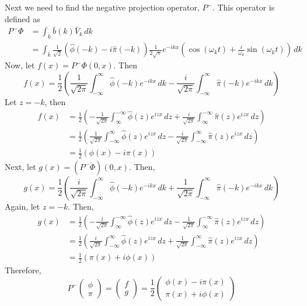\documentclass[12pt,oneside]{article}
\begin{document}
Next we need to find the negative projection operator, $P^-$. This operator is
defined as 
\begin{align}
P^-\Phi&=\int_k\bar{b}(k)\bar{V}_k\, dk\\
&=\int_{k}\frac{1}{\sqrt{2}}\left(\hat{\phi}(-k)-i\hat{\pi}(-k)\right)\frac{1}{2\sqrt{\pi}}e^{-ikx}\left(\cos(\omega_{k}t)
+\frac{i}{\omega_{k}}\sin(\omega_{k}t)\right)\, dk
\end{align}
Now, let $f(x)=P^{-}\Phi(0,x)$. Then
\begin{equation}
f(x)=\frac{1}{2}\left(\frac{1}{\sqrt{2\pi}}\int_{-\infty}^{\infty}\hat{\phi}(-k)e^{-ikx}\, dk-\frac{i}{\sqrt{2\pi}}\int_{-\infty}^{\infty}\hat{\pi}(-k)e^{-ikx}\, dk\right)
\end{equation}
Let $z=-k$, then
\begin{align*}
f(x)&=\frac{1}{2}\left(-\frac{1}{\sqrt{2\pi}}\int_{\infty}^{-\infty}\hat{\phi}(z)e^{izx}\, dz+\frac{i}{\sqrt{2\pi}}\int_{\infty}^{-\infty}\hat{\pi}(z)e^{izx}\, dz\right)\\
&=\frac{1}{2}\left(\frac{1}{\sqrt{2\pi}}\int_{-\infty}^{\infty}\hat{\phi}(z)e^{izx}\, dz-\frac{i}{\sqrt{2\pi}}\int_{-\infty}^{\infty}\hat{\pi}(z)e^{izx}\, dz\right)\\
&=\frac{1}{2}(\phi(x)-i\pi(x))
\end{align*}
Next, let $g(x)=(P^{-}\dot{\Phi})(0,x)$. Then,
\begin{equation}
g(x)=\frac{1}{2}\left(\frac{i}{\sqrt{2\pi}}\int^{\infty}_{-\infty}\hat{\phi}(-k)e^{-ikx}\, dk+\frac{1}{\sqrt{2\pi}}\int^{\infty}_{-\infty}\hat{\pi}(-k)e^{-ikx}\, dk\right)
\end{equation}
Again, let $z=-k$. Then,
\begin{align*}
g(x)&=\frac{1}{2}\left(-\frac{i}{\sqrt{2\pi}}\int^{-\infty}_{\infty}\hat{\phi}(z)e^{izx}\, dz-\frac{1}{\sqrt{2\pi}}\int^{-\infty}_{\infty}\hat{\pi}(z)e^{izx}\, dz\right) \\
&=\frac{1}{2}\left(\frac{i}{\sqrt{2\pi}}\int^{\infty}_{-\infty}\hat{\phi}(z)e^{izx}\, dz+\frac{1}{\sqrt{2\pi}}\int^{\infty}_{-\infty}\hat{\pi}(z)e^{izx}\, dz\right) \\
&=\frac{1}{2}(\pi(x)+i\phi(x))
\end{align*}
Therefore,
\begin{equation}
P^{-}\begin{pmatrix}\phi \\ \pi\end{pmatrix}=\begin{pmatrix}f \\ g\end{pmatrix}=\frac{1}{2}\begin{pmatrix}\phi(x)-i\pi(x)\\ \pi(x)+i\phi(x)\end{pmatrix}
\end{equation}
\end{document}
